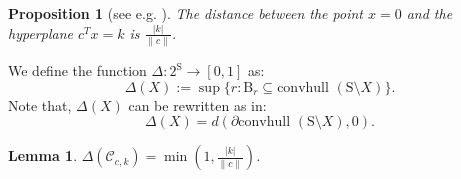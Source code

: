 \documentclass[letterpaper, 10 pt, conference]{ieeeconf}  %
\newcommand{\convhull}{\mbox{convhull } }
\newcommand{\conv}{\convhull }
\newcommand{\koverc}{\frac{|k_i|}{\|c_i\|} }
\newcommand{\dist}{d}
\newcommand{\calC}{\mathcal{C}}
\newcommand{\sphere}{\text{S}}
\newcommand{\ball}{\text{B}}
\newtheorem{lemma}[theorem]{Lemma}
\newtheorem{proposition}[theorem]{Proposition}
\begin{document}

\begin{proposition}[see e.g. \cite{boyd}]\label{prop:distance}The distance between the point $x=0$ and the hyperplane $c^Tx = k$ is $\frac{|k|}{\|c\|}$.
\end{proposition}



We define the function $\Delta : 2^\sphere \to [0,1]$ as:
\begin{equation}\label{shrinkage}
\Delta(X) := \sup \{r: \ball_r \subseteq \conv(\sphere \setminus X)\}.\end{equation}
Note that, $\Delta(X)$ can be rewritten as in:
\begin{equation}\label{shrinkage2}
\Delta(X) =  \dist(\partial  \conv(\sphere \setminus X), 0).
\end{equation}


\begin{lemma}\label{lemma:delta2}$\Delta(\calC_{c,k}) = \min\left(1, \frac{|k|}{\|c\|}\right)$.
\end{lemma}
\end{document}
